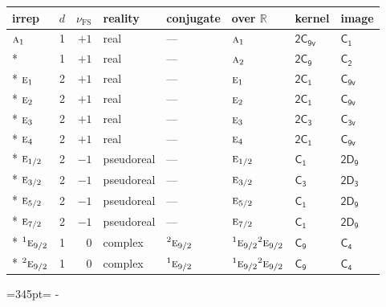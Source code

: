 \documentclass[10pt,a4paper]{article}
\makeatletter
\def\grouprule#1#2{\noalign{\marks\LTgroupmarks{\the\belowrulesep}\nobreak\vskip#1%
  \vskip\aboverulesep}\multispan\LT@cols\unskip{\leaders\hrule\@height#2\hfill\kern\z@}\cr
  \noalign{\penalty\LTrulebreak\vskip\belowrulesep\global\@lastruleclass\z@}}
\newcommand{\needspace}[1]{\par\penalty-100\begingroup\dimen0=#1\relax\dimen2=\pagegoal
  \advance\dimen2-\pagetotal\ifdim\dimen0>\dimen2\relax\ifdim\dimen2>0pt\vfil\break\fi\fi
  \endgroup}
\numberwithin{equation}{section}
\newcommand{\grp}[1]{\mathsf{#1}}
\newcommand{\irr}[1]{\text{\normalfont\scshape #1}}
\newcommand{\conjpair}[1]{{}^{#1}}
\newcommand{\detbox}[1]{{\setlength{\fboxsep}{1pt}\fbox{#1}}}
\newcommand{\fsind}{\nu_{\mathrm{FS}}}
\makeatother
\begin{document}
\setlength{\emergencystretch}{2em}\par\setlength{\emergencystretch}{0pt}
{\small\renewcommand{\arraystretch}{1.25}\setlength{\tabcolsep}{4pt}\begin{longtable}{@{}lrrlllll@{}}\toprule
irrep & $d$ & $\fsind$ & reality & conjugate & over $\mathbb{R}$ & kernel & image\\\midrule\endhead
\bottomrule\endfoot\endlastfoot
$\irr{a}_{1}$ & 1 & $+1$ & real & --- & $\irr{a}_{1}$ & \href{2C9v.pdf}{$\grp{2C_{9v}}$} & \href{../../../rotation/data/pdf/C1.pdf}{$\grp{C_{1}}$}\\*
\detbox{$\irr{a}_{2}$} & 1 & $+1$ & real & --- & $\irr{a}_{2}$ & \href{2C9.pdf}{$\grp{2C_{9}}$} & \href{../../../rotation/data/pdf/C2.pdf}{$\grp{C_{2}}$}\\*
$\irr{e}_{1}$ & 2 & $+1$ & real & --- & $\irr{e}_{1}$ & \href{2C1.pdf}{$\grp{2C_{1}}$} & \href{../../../rotation/data/pdf/C9v.pdf}{$\grp{C_{9v}}$}\\*
$\irr{e}_{2}$ & 2 & $+1$ & real & --- & $\irr{e}_{2}$ & \href{2C1.pdf}{$\grp{2C_{1}}$} & \href{../../../rotation/data/pdf/C9v.pdf}{$\grp{C_{9v}}$}\\*
$\irr{e}_{3}$ & 2 & $+1$ & real & --- & $\irr{e}_{3}$ & \href{2C3.pdf}{$\grp{2C_{3}}$} & \href{../../../rotation/data/pdf/C3v.pdf}{$\grp{C_{3v}}$}\\*
$\irr{e}_{4}$ & 2 & $+1$ & real & --- & $\irr{e}_{4}$ & \href{2C1.pdf}{$\grp{2C_{1}}$} & \href{../../../rotation/data/pdf/C9v.pdf}{$\grp{C_{9v}}$}\\*
\grouprule{0pt}{\lightrulewidth}
$\irr{e}_{1/2}$ & 2 & $-1$ & pseudoreal & --- & $\irr{e}_{1/2}$ & \href{C1.pdf}{$\grp{C_{1}}$} & \href{2D9.pdf}{$\grp{2D_{9}}$}\\*
$\irr{e}_{3/2}$ & 2 & $-1$ & pseudoreal & --- & $\irr{e}_{3/2}$ & \href{C3.pdf}{$\grp{C_{3}}$} & \href{2D3.pdf}{$\grp{2D_{3}}$}\\*
$\irr{e}_{5/2}$ & 2 & $-1$ & pseudoreal & --- & $\irr{e}_{5/2}$ & \href{C1.pdf}{$\grp{C_{1}}$} & \href{2D9.pdf}{$\grp{2D_{9}}$}\\*
$\irr{e}_{7/2}$ & 2 & $-1$ & pseudoreal & --- & $\irr{e}_{7/2}$ & \href{C1.pdf}{$\grp{C_{1}}$} & \href{2D9.pdf}{$\grp{2D_{9}}$}\\*
$\conjpair{1}\irr{e}_{9/2}$ & 1 & $0$ & complex & $\conjpair{2}\irr{e}_{9/2}$ & $\conjpair{1}\irr{e}_{9/2}\conjpair{2}\irr{e}_{9/2}$ & \href{C9.pdf}{$\grp{C_{9}}$} & \href{../../../rotation/data/pdf/C4.pdf}{$\grp{C_{4}}$}\\*
$\conjpair{2}\irr{e}_{9/2}$ & 1 & $0$ & complex & $\conjpair{1}\irr{e}_{9/2}$ & $\conjpair{1}\irr{e}_{9/2}\conjpair{2}\irr{e}_{9/2}$ & \href{C9.pdf}{$\grp{C_{9}}$} & \href{../../../rotation/data/pdf/C4.pdf}{$\grp{C_{4}}$}\\
\bottomrule\end{longtable}}
\needspace{345pt}
\end{document}
